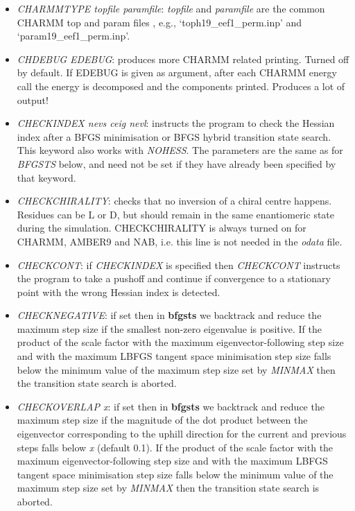 \documentclass[12pt,a4paper,dvips]{article}
\begin{document}
\begin{itemize}
\item {\it CHARMMTYPE topfile paramfile\/}:  {\it topfile} and {\it paramfile} are the 
common CHARMM top and param files , e.g., `toph19\_eef1\_perm.inp' and `param19\_eef1\_perm.inp'.

\item {\it CHDEBUG EDEBUG\/}: produces more CHARMM related printing. Turned off by default.
If EDEBUG is given as argument, after each CHARMM energy call the energy is decomposed
and the components printed. Produces a lot of output!

\item {\it CHECKINDEX nevs ceig nevl\/}: instructs the program to check the Hessian
index after a BFGS minimisation or BFGS hybrid transition
state search. This keyword also works with {\it NOHESS\/}.
The parameters are the same as for {\it BFGSTS\/} below, and need not be set
if they have already been specified by that keyword.

\item {\it CHECKCHIRALITY\/}: checks that no inversion of a chiral centre happens.
Residues can be L or D, but should remain in the same enantiomeric state during 
the simulation. CHECKCHIRALITY is always turned on for CHARMM, AMBER9 and NAB, i.e. this line
is not needed in the {\it odata} file. 

\item {\it CHECKCONT\/}: if {\it CHECKINDEX\/} is specified then {\it CHECKCONT\/}
instructs the program to take a pushoff and continue if convergence to a stationary
point with the wrong Hessian index is detected. 

\item {\it CHECKNEGATIVE\/}: if set then in {\bf bfgsts} we backtrack and reduce the maximum step
size if the smallest non-zero eigenvalue is positive.
If the product of the scale factor with the maximum eigenvector-following step size
and with the maximum LBFGS tangent space minimisation step size falls below the
minimum value of the maximum step size set by {\it MINMAX\/} then the transition
state search is aborted.

\item {\it CHECKOVERLAP x\/}: if set then in {\bf bfgsts} we backtrack and reduce the maximum step
size if the magnitude of the dot product between the eigenvector corresponding to the
uphill direction for the current and previous steps falls below {\it x\/} (default 0.1).
If the product of the scale factor with the maximum eigenvector-following step size
and with the maximum LBFGS tangent space minimisation step size falls below the
minimum value of the maximum step size set by {\it MINMAX\/} then the transition
state search is aborted.


\end{itemize}
\end{document}
